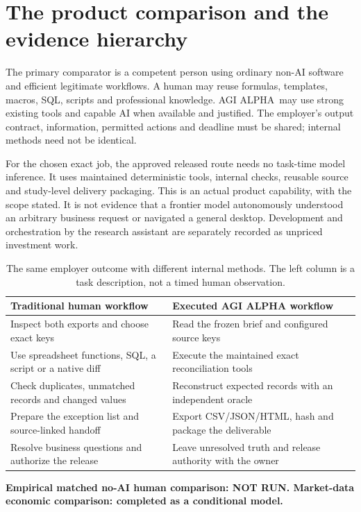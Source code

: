 \documentclass[11pt,a4paper]{article}
\newcommand{\smalltable}{\small\setlength{\tabcolsep}{5pt}}
\newcommand{\Alpha}{AGI ALPHA}
\begin{document}
\section{The product comparison and the evidence hierarchy}

The primary comparator is a competent person using ordinary non-AI software and efficient legitimate workflows. A human may reuse formulas, templates, macros, SQL, scripts and professional knowledge. \Alpha\ may use strong existing tools and capable AI when available and justified. The employer's output contract, information, permitted actions and deadline must be shared; internal methods need not be identical.

For the chosen exact job, the approved released route needs no task-time model inference. It uses maintained deterministic tools, internal checks, reusable source and study-level delivery packaging. This is an actual product capability, with the scope stated. It is not evidence that a frontier model autonomously understood an arbitrary business request or navigated a general desktop. Development and orchestration by the research assistant are separately recorded as unpriced investment work.

\begin{table}[H]\centering\smalltable
\begin{tabularx}{\linewidth}{YY}
\toprule
Traditional human workflow & Executed AGI ALPHA workflow\\
\midrule
Inspect both exports and choose exact keys & Read the frozen brief and configured source keys\\
Use spreadsheet functions, SQL, a script or a native diff & Execute the maintained exact reconciliation tools\\
Check duplicates, unmatched records and changed values & Reconstruct expected records with an independent oracle\\
Prepare the exception list and source-linked handoff & Export CSV/JSON/HTML, hash and package the deliverable\\
Resolve business questions and authorize the release & Leave unresolved truth and release authority with the owner\\
\bottomrule
\end{tabularx}
\caption{The same employer outcome with different internal methods. The left column is a task description, not a timed human observation.}
\end{table}

\textbf{Empirical matched no-AI human comparison: NOT RUN. Market-data economic comparison: completed as a conditional model.}
\end{document}
